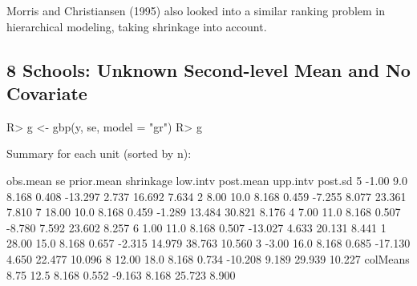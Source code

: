 \documentclass[article]{jss}
\begin{document}


Morris and Christiansen (1995) also looked into a similar ranking problem in hierarchical modeling, taking shrinkage into account.
\\

\subsection[Unknown Second-level Mean and No Covariate]{8 Schools: Unknown Second-level Mean and No Covariate}
\begin{CodeChunk}
\begin{CodeInput}
R> g <- gbp(y, se, model = "gr")
R> g
\end{CodeInput}
\begin{CodeOutput}
Summary for each unit (sorted by n):

         obs.mean   se prior.mean shrinkage low.intv post.mean upp.intv post.sd
5           -1.00  9.0      8.168     0.408  -13.297     2.737   16.692   7.634
2            8.00 10.0      8.168     0.459   -7.255     8.077   23.361   7.810
7           18.00 10.0      8.168     0.459   -1.289    13.484   30.821   8.176
4            7.00 11.0      8.168     0.507   -8.780     7.592   23.602   8.257
6            1.00 11.0      8.168     0.507  -13.027     4.633   20.131   8.441
1           28.00 15.0      8.168     0.657   -2.315    14.979   38.763  10.560
3           -3.00 16.0      8.168     0.685  -17.130     4.650   22.477  10.096
8           12.00 18.0      8.168     0.734  -10.208     9.189   29.939  10.227
colMeans     8.75 12.5      8.168     0.552   -9.163     8.168   25.723   8.900
\end{CodeOutput}
\end{CodeChunk}
\end{document}
